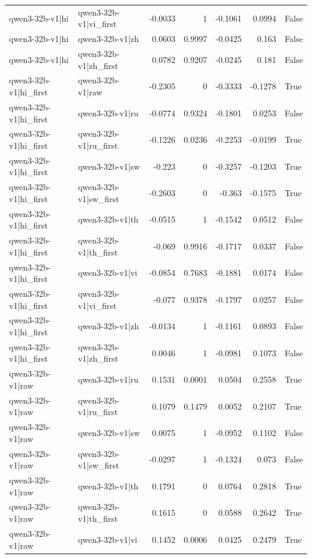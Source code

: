 \begin{table}
\begin{tabular}{l l r r r r l}
qwen3-32b-v1|hi & qwen3-32b-v1|vi_first & -0.0033 & 1 & -0.1061 & 0.0994 & False \\
qwen3-32b-v1|hi & qwen3-32b-v1|zh & 0.0603 & 0.9997 & -0.0425 & 0.163 & False \\
qwen3-32b-v1|hi & qwen3-32b-v1|zh_first & 0.0782 & 0.9207 & -0.0245 & 0.181 & False \\
qwen3-32b-v1|hi_first & qwen3-32b-v1|raw & -0.2305 & 0 & -0.3333 & -0.1278 & True \\
qwen3-32b-v1|hi_first & qwen3-32b-v1|ru & -0.0774 & 0.9324 & -0.1801 & 0.0253 & False \\
qwen3-32b-v1|hi_first & qwen3-32b-v1|ru_first & -0.1226 & 0.0236 & -0.2253 & -0.0199 & True \\
qwen3-32b-v1|hi_first & qwen3-32b-v1|sw & -0.223 & 0 & -0.3257 & -0.1203 & True \\
qwen3-32b-v1|hi_first & qwen3-32b-v1|sw_first & -0.2603 & 0 & -0.363 & -0.1575 & True \\
qwen3-32b-v1|hi_first & qwen3-32b-v1|th & -0.0515 & 1 & -0.1542 & 0.0512 & False \\
qwen3-32b-v1|hi_first & qwen3-32b-v1|th_first & -0.069 & 0.9916 & -0.1717 & 0.0337 & False \\
qwen3-32b-v1|hi_first & qwen3-32b-v1|vi & -0.0854 & 0.7683 & -0.1881 & 0.0174 & False \\
qwen3-32b-v1|hi_first & qwen3-32b-v1|vi_first & -0.077 & 0.9378 & -0.1797 & 0.0257 & False \\
qwen3-32b-v1|hi_first & qwen3-32b-v1|zh & -0.0134 & 1 & -0.1161 & 0.0893 & False \\
qwen3-32b-v1|hi_first & qwen3-32b-v1|zh_first & 0.0046 & 1 & -0.0981 & 0.1073 & False \\
qwen3-32b-v1|raw & qwen3-32b-v1|ru & 0.1531 & 0.0001 & 0.0504 & 0.2558 & True \\
qwen3-32b-v1|raw & qwen3-32b-v1|ru_first & 0.1079 & 0.1479 & 0.0052 & 0.2107 & True \\
qwen3-32b-v1|raw & qwen3-32b-v1|sw & 0.0075 & 1 & -0.0952 & 0.1102 & False \\
qwen3-32b-v1|raw & qwen3-32b-v1|sw_first & -0.0297 & 1 & -0.1324 & 0.073 & False \\
qwen3-32b-v1|raw & qwen3-32b-v1|th & 0.1791 & 0 & 0.0764 & 0.2818 & True \\
qwen3-32b-v1|raw & qwen3-32b-v1|th_first & 0.1615 & 0 & 0.0588 & 0.2642 & True \\
qwen3-32b-v1|raw & qwen3-32b-v1|vi & 0.1452 & 0.0006 & 0.0425 & 0.2479 & True \\

\end{tabular}
\end{table}
